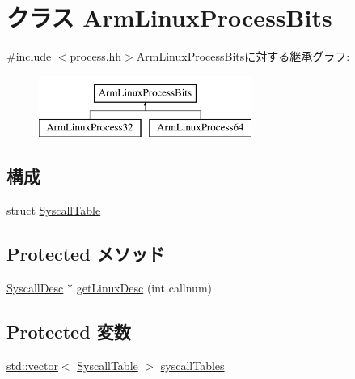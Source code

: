\hypertarget{classArmLinuxProcessBits}{
\section{クラス ArmLinuxProcessBits}
\label{classArmLinuxProcessBits}
}


{\ttfamily \#include $<$process.hh$>$}ArmLinuxProcessBitsに対する継承グラフ:\begin{figure}[H]
\begin{center}
\leavevmode
\includegraphics[height=2cm]{classArmLinuxProcessBits}
\end{center}
\end{figure}
\subsection*{構成}
\begin{DoxyCompactItemize}
\item 
struct \hyperlink{structArmLinuxProcessBits_1_1SyscallTable}{SyscallTable}
\end{DoxyCompactItemize}
\subsection*{Protected メソッド}
\begin{DoxyCompactItemize}
\item 
\hyperlink{classSyscallDesc}{SyscallDesc} $\ast$ \hyperlink{classArmLinuxProcessBits_aab44167d5fe3af4a32c5a6a796719df1}{getLinuxDesc} (int callnum)
\end{DoxyCompactItemize}
\subsection*{Protected 変数}
\begin{DoxyCompactItemize}
\item 
\hyperlink{classstd_1_1vector}{std::vector}$<$ \hyperlink{structArmLinuxProcessBits_1_1SyscallTable}{SyscallTable} $>$ \hyperlink{classArmLinuxProcessBits_a68edae7aeb855e305134f67b1a47a98d}{syscallTables}
\end{DoxyCompactItemize}


